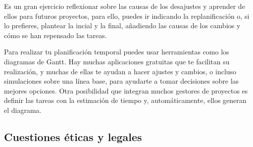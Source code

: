Es un gran ejercicio reflexionar sobre las causas de los desajustes y aprender de ellos para futuros proyectos, para ello, puedes ir indicando la replanificación o, si lo prefieres, plantear la incial y la final, añadiendo las causas de los cambios y cómo se han repensado las tareas.

Para realizar tu planificación temporal puedes usar herramientas como los diagramas de Gantt. Hay muchas aplicaciones gratuitas que te facilitan su realización, y muchas de ellas te ayudan a hacer ajustes y cambios, o incluso simulaciones sobre una línea base, para ayudarte a tomar decisiones sobre las mejores opciones. Otra posibilidad que integran muchos gestores de proyectos es definir las tareas con la estimación de tiempo y, automáticamente, ellos generan el diagrama.


\subsection{Cuestiones éticas y legales}%

